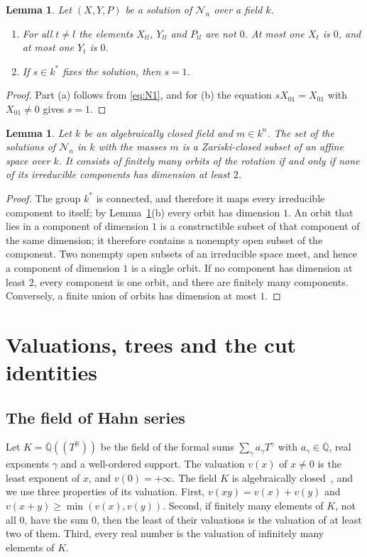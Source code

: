 \documentclass[11pt]{amsart}
\newtheorem{lemma}[theorem]{Lemma}
\theoremstyle{definition}
\theoremstyle{remark}
\numberwithin{equation}{section}
\newcommand{\Qbar}{\overline{\mathbb{Q}}}
\newcommand{\RR}{\mathbb{R}}
\newcommand{\cN}{\mathcal{N}}
\begin{document}
\begin{lemma}\label{lem:facts}
Let $(X, Y, P)$ be a solution of $\cN_n$ over a field $k$.
\begin{enumerate}
\item[(a)] For all $t \ne l$ the elements $X_{tl}$, $Y_{tl}$ and $P_{tl}$ are not $0$. At most one $X_t$
is $0$, and at most one $Y_t$ is $0$.
\item[(b)] If $s \in k^{*}$ fixes the solution, then $s = 1$.
\end{enumerate}
\end{lemma}

\begin{proof}
Part (a) follows from \eqref{eq:N1}, and for (b) the equation $s X_{01} = X_{01}$ with $X_{01} \ne 0$
gives $s = 1$.
\end{proof}

\begin{lemma}\label{lem:orbits}
Let $k$ be an algebraically closed field and $m \in k^n$. The set of the solutions of $\cN_n$ in $k$ with
the masses $m$ is a Zariski-closed subset of an affine space over $k$. It consists of finitely many orbits
of the rotation if and only if none of its irreducible components has dimension at least $2$.
\end{lemma}

\begin{proof}
The group $k^{*}$ is connected, and therefore it maps every irreducible component to itself; by
Lemma~\ref{lem:facts}(b) every orbit has dimension $1$. An orbit that lies in a component of dimension
$1$ is a constructible subset of that component of the same dimension; it therefore contains a nonempty
open subset of the component. Two nonempty open subsets of an irreducible space meet, and hence a
component of dimension $1$ is a single orbit. If no component has dimension at least $2$, every
component is one orbit, and there are finitely many components. Conversely, a finite union of orbits has
dimension at most $1$.
\end{proof}

\section{Valuations, trees and the cut identities}\label{sec:val}

\subsection{The field of Hahn series} Let $K = \Qbar((T^{\RR}))$ be the field of the formal sums
$\sum_{\gamma} a_\gamma T^{\gamma}$ with $a_\gamma \in \Qbar$, real exponents $\gamma$ and a well-ordered
support. The valuation $v(x)$ of $x \ne 0$ is the least exponent of $x$, and $v(0) = +\infty$. The field
$K$ is algebraically closed~\cite[Theorem~1 and Corollary~4]{poonen1993}, and we use three properties
of its valuation. First, $v(xy) = v(x) + v(y)$ and $v(x + y) \ge \min(v(x), v(y))$. Second, if finitely many elements
of $K$, not all $0$, have the sum $0$, then the least of their valuations is the valuation of at least
two of them. Third, every real number is the valuation of infinitely many elements of $K$.
\end{document}
